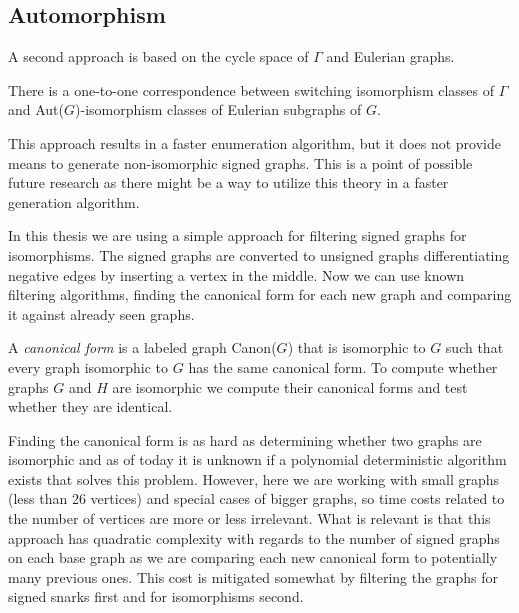 \subsection{Automorphism}



A second approach is based on the cycle space of $\Gamma$ and Eulerian graphs.

\begin{theorem}
    There is a one-to-one correspondence between switching isomorphism classes of $\Gamma$ and Aut($G$)-isomorphism classes of Eulerian subgraphs of $G$.
\end{theorem}

This approach results in a faster enumeration algorithm, but it does not provide means to generate non-isomorphic signed graphs. This is a point of possible future research as there might be a way to utilize this theory in a faster generation algorithm.

In this thesis we are using a simple approach for filtering signed graphs for isomorphisms. The signed graphs are converted to unsigned graphs differentiating negative edges by inserting a vertex in the middle. Now we can use known filtering algorithms, finding the canonical form for each new graph and comparing it against already seen graphs.

\begin{definition}
    A \textit{canonical form} is a labeled graph Canon($G$) that is isomorphic to $G$ such that every graph isomorphic to $G$ has the same canonical form. To compute whether graphs $G$ and $H$ are isomorphic we compute their canonical forms and test whether they are identical.
\end{definition}

Finding the canonical form is as hard as determining whether two graphs are isomorphic and as of today it is unknown if a polynomial deterministic algorithm exists that solves this problem. However, here we are working with small graphs (less than 26 vertices) and special cases of bigger graphs, so time costs related to the number of vertices are more or less irrelevant. What is relevant is that this approach has quadratic complexity with regards to the number of signed graphs on each base graph as we are comparing each new canonical form to potentially many previous ones. This cost is mitigated somewhat by filtering the graphs for signed snarks first and for isomorphisms second.
